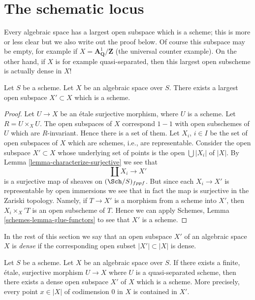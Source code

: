 \section{The schematic locus}
\label{section-schematic}

\noindent
Every algebraic space has a largest open subspace which is a
scheme; this is more or less clear but we also write out the proof below.
Of course this subspace may be empty, for example if
$X = \mathbf{A}^1_{\mathbf{Q}}/\mathbf{Z}$ (the universal
counter example). On the other hand, if $X$ is for example quasi-separated,
then this largest open subscheme is actually dense in $X$!

\begin{lemma}
\label{lemma-subscheme}
Let $S$ be a scheme.
Let $X$ be an algebraic space over $S$.
There exists a largest open subspace $X' \subset X$ which is a scheme.
\end{lemma}

\begin{proof}
Let $U \to X$ be an \'etale surjective morphism, where $U$ is a scheme.
Let $R = U \times_X U$. The open subspaces of $X$ correspond $1 - 1$
with open subschemes of $U$ which are $R$-invariant. Hence there is a
set of them. Let $X_i$, $i \in I$ be the set of open subspaces
of $X$ which are schemes, i.e., are representable. Consider the
open subspace $X' \subset X$ whose underlying set of points is
the open $\bigcup |X_i|$ of $|X|$. By
Lemma \ref{lemma-characterize-surjective}
we see that
$$
\coprod X_i \longrightarrow X'
$$
is a surjective map of sheaves on $(\Sch/S)_{fppf}$.
But since each $X_i \to X'$ is representable by open immersions
we see that in fact the map is surjective in the Zariski
topology. Namely, if $T \to X'$ is a morphism from a scheme
into $X'$, then $X_i \times_X' T$ is an open subscheme of $T$.
Hence we can apply
Schemes, Lemma \ref{schemes-lemma-glue-functors}
to see that $X'$ is a scheme.
\end{proof}

\noindent
In the rest of this section we say that an open subspace
$X'$ of an algebraic space $X$ is {\it dense} if the corresponding
open subset $|X'| \subset |X|$ is dense.

\begin{lemma}
\label{lemma-quasi-separated-finite-etale-cover-dense-open-scheme}
Let $S$ be a scheme. Let $X$ be an algebraic space over $S$.
If there exists a finite, \'etale, surjective morphism
$U \to X$ where $U$ is a quasi-separated scheme, then
there exists a dense open subspace $X'$ of $X$ which is a scheme.
More precisely, every point $x \in |X|$ of codimension $0$ in $X$
is contained in $X'$.
\end{lemma}

